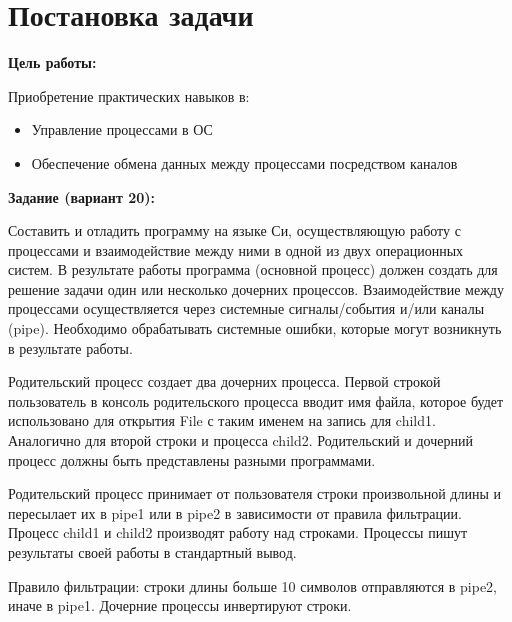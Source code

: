 \section{Постановка задачи}

{\bfseries Цель работы:} 

Приобретение практических навыков в:

\begin{itemize}
    \item Управление процессами в ОС
    \item Обеспечение обмена данных между процессами посредством каналов
\end{itemize}

{\bfseries Задание (вариант 20):} 

Составить и отладить программу на языке Си, осуществляющую работу с процессами и взаимодействие между ними в одной из двух операционных систем. В результате работы программа (основной процесс) должен создать для решение задачи один или несколько дочерних процессов. Взаимодействие между процессами осуществляется через системные сигналы/события и/или каналы (pipe). Необходимо обрабатывать системные ошибки, которые могут возникнуть в результате работы.

Родительский процесс создает два дочерних процесса. Первой строкой пользователь в консоль родительского процесса вводит имя файла, которое будет использовано для открытия File с таким именем на запись для child1. Аналогично для второй строки и процесса child2. Родительский и дочерний процесс должны быть представлены разными программами.

Родительский процесс принимает от пользователя строки произвольной длины и пересылает их в pipe1 или в pipe2 в зависимости от правила фильтрации. Процесс child1 и child2 производят работу над строками. Процессы пишут результаты своей работы в стандартный вывод.

Правило фильтрации: строки длины больше 10 символов отправляются в pipe2, иначе в pipe1. Дочерние процессы инвертируют строки.

\pagebreak
